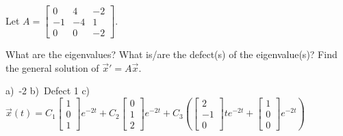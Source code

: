 \begin{exercise}
\pagebreak[2]
Let
$A = \left[ \begin{smallmatrix}
0 & 4 & -2 \\
-1 & -4 & 1 \\
0 & 0 & -2
\end{smallmatrix} \right]$.
\begin{tasks}
\task What are the eigenvalues?
\task What is/are the defect(s) of the eigenvalue(s)?
\task Find the general solution of ${\vec{x}}' = A \vec{x}$.
\end{tasks}
\end{exercise}
\comboSol{%
}
{%
a)~-2 \quad b)~Defect 1 \quad c)~$\vec{x}(t) = C_1 \left[\begin{smallmatrix} 1 \\ 0 \\ 1 \end{smallmatrix}\right]e^{-2t} + C_2\left[\begin{smallmatrix} 0 \\1 \\ 2 \end{smallmatrix}\right]e^{-2t} + C_3\left( \left[\begin{smallmatrix} 2 \\ -1 \\ 0 \end{smallmatrix}\right]te^{-2t} + \left[\begin{smallmatrix} 1 \\ 0 \\ 0 \end{smallmatrix}\right]e^{-2t}\right)$
}

